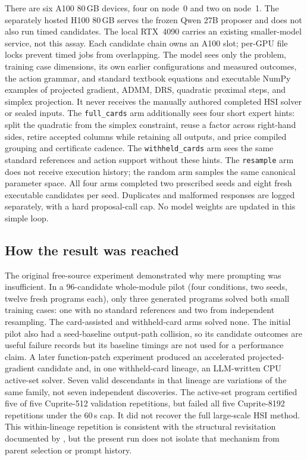 There are six A100 80\,GB devices, four on node~0 and two on node~1. The
separately hosted H100 80\,GB serves the frozen Qwen 27B proposer and does not
also run timed candidates. The local RTX~4090 carries an existing smaller-model
service, not this assay. Each candidate chain owns an A100 slot; per-GPU file
locks prevent timed jobs from overlapping. The model sees only the problem,
training case dimensions, its own earlier configurations and measured outcomes,
the action grammar, and standard textbook equations and executable NumPy
examples of projected gradient, ADMM, DRS, quadratic proximal steps, and simplex
projection. It never receives the manually authored completed HSI solver or
sealed inputs. The \texttt{full\_cards} arm additionally sees four short expert
hints: split the quadratic from the simplex constraint, reuse a factor across
right-hand sides, retire accepted columns while retaining all outputs, and
price compiled grouping and certificate cadence. The \texttt{withheld\_cards}
arm sees the same standard references and action support without these hints.
The \texttt{resample} arm does not receive execution history; the random arm
samples the same canonical parameter space. All four arms completed two
prescribed seeds and eight fresh executable candidates per seed. Duplicates and malformed
responses are logged separately, with a hard proposal-call cap. No model
weights are updated in this simple loop.

\subsection{How the result was reached}
The original free-source experiment demonstrated why mere prompting was
insufficient. In a $96$-candidate whole-module pilot (four conditions, two
seeds, twelve fresh programs each), only three generated programs solved both
small training cases: one with no standard references and two from independent
resampling. The card-assisted and withheld-card arms solved none. The initial
pilot also had a seed-baseline output-path collision, so its candidate outcomes
are useful failure records but its baseline timings are not used for a
performance claim. A later function-patch experiment produced an accelerated
projected-gradient candidate and, in one withheld-card lineage, an LLM-written
CPU active-set solver. Seven valid descendants in that lineage are variations
of the same family, not seven independent discoveries. The active-set program
certified five of five Cuprite-512 validation repetitions, but failed all five
Cuprite-8192 repetitions under the $60$\,s cap. It did not recover the full
large-scale HSI method. This within-lineage repetition is consistent with the
structural revisitation documented by \citet{gurkan2026mutation}, but the
present run does not isolate that mechanism from parent selection or prompt
history.

